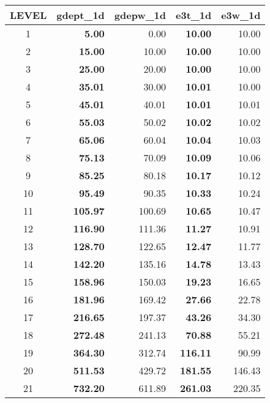 \documentclass[../tex_main/NEMO_manual]{subfiles}
\begin{document}
\begin{table}     \begin{center} \begin{tabular}{c||r|r|r|r}
\hline
\textbf{LEVEL}& \textbf{gdept\_1d}& \textbf{gdepw\_1d}& \textbf{e3t\_1d }& \textbf{e3w\_1d  } \\ \hline
1	&	\textbf{  5.00}	&       0.00 &	\textbf{ 10.00} &	 10.00 \\	\hline
2	&	\textbf{15.00}	& 	  10.00 &	\textbf{ 10.00} &	 10.00 \\	\hline
3	&	\textbf{25.00}	&	  20.00 &	\textbf{ 10.00} & 	 10.00 \\	\hline
4	&	\textbf{35.01}	&	  30.00 & 	\textbf{ 10.01} & 	 10.00 \\	\hline
5	&	\textbf{45.01}	&	  40.01 &	\textbf{ 10.01} &	 10.01 \\	\hline
6	&	\textbf{55.03}	&	  50.02 &	\textbf{ 10.02} & 	 10.02 \\	\hline
7	&	\textbf{65.06}	&	  60.04 &	\textbf{ 10.04} &	 10.03 \\	\hline
8	&	\textbf{75.13}	&	  70.09 &	\textbf{ 10.09} &	 10.06 \\	\hline
9	&	\textbf{85.25}	&	  80.18 &	\textbf{ 10.17} &	 10.12 \\	\hline
10	& 	\textbf{95.49}	& 	  90.35 &	\textbf{ 10.33} &	 10.24 \\	\hline
11	& 	\textbf{105.97}	& 	 100.69 &	\textbf{ 10.65} &	 10.47 \\	\hline
12	& 	\textbf{116.90}	& 	 111.36 &	\textbf{ 11.27} &	 10.91 \\	\hline
13	& 	\textbf{128.70}	& 	 122.65 &	\textbf{ 12.47} &	 11.77 \\	\hline
14	& 	\textbf{142.20}	& 	 135.16 &	\textbf{ 14.78} &	 13.43 \\	\hline
15	& 	\textbf{158.96}	& 	 150.03 &	\textbf{ 19.23} &	 16.65 \\	\hline
16	& 	\textbf{181.96}	& 	 169.42 &	\textbf{ 27.66} &	 22.78 \\	\hline
17	& 	\textbf{216.65}	& 	 197.37 & 	\textbf{ 43.26} &	 34.30 \\ \hline
18	& 	\textbf{272.48}	& 	 241.13 & 	\textbf{ 70.88} &	 55.21 \\ \hline
19	& 	\textbf{364.30}	& 	 312.74 & 	\textbf{116.11} &	 90.99 \\ \hline
20	& 	\textbf{511.53}	& 	 429.72 & 	\textbf{181.55} & 	146.43 \\ \hline
21	& 	\textbf{732.20}	& 	 611.89 & 	\textbf{261.03} & 	220.35 \\ \hline

\end{tabular}
\end{center}
\end{table}
\end{document}
